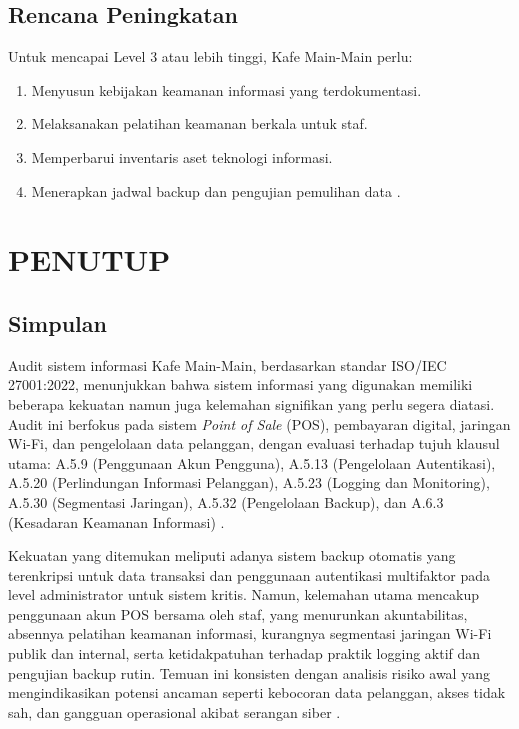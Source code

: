 \documentclass[12pt, a4paper]{report}
\begin{document}
\section{Rencana Peningkatan}
Untuk mencapai Level 3 atau lebih tinggi, Kafe Main-Main perlu:
\begin{enumerate}
    \item Menyusun kebijakan keamanan informasi yang terdokumentasi.
    \item Melaksanakan pelatihan keamanan berkala untuk staf.
    \item Memperbarui inventaris aset teknologi informasi.
    \item Menerapkan jadwal backup dan pengujian pemulihan data \citep{rokhman2018implementasi}.
\end{enumerate}

\chapter{PENUTUP}
\label{bab:penutup}

\section{Simpulan}
Audit sistem informasi Kafe Main-Main, berdasarkan standar ISO/IEC 27001:2022, menunjukkan bahwa sistem informasi yang digunakan memiliki beberapa kekuatan namun juga kelemahan signifikan yang perlu segera diatasi. Audit ini berfokus pada sistem \textit{Point of Sale} (POS), pembayaran digital, jaringan Wi-Fi, dan pengelolaan data pelanggan, dengan evaluasi terhadap tujuh klausul utama: A.5.9 (Penggunaan Akun Pengguna), A.5.13 (Pengelolaan Autentikasi), A.5.20 (Perlindungan Informasi Pelanggan), A.5.23 (Logging dan Monitoring), A.5.30 (Segmentasi Jaringan), A.5.32 (Pengelolaan Backup), dan A.6.3 (Kesadaran Keamanan Informasi) \citep{iso27001, auditkafe2025}.

 Kekuatan yang ditemukan meliputi adanya sistem backup otomatis yang terenkripsi untuk data transaksi dan penggunaan autentikasi multifaktor pada level administrator untuk sistem kritis. Namun, kelemahan utama mencakup penggunaan akun POS bersama oleh staf, yang menurunkan akuntabilitas, absennya pelatihan keamanan informasi, kurangnya segmentasi jaringan Wi-Fi publik dan internal, serta ketidakpatuhan terhadap praktik logging aktif dan pengujian backup rutin. Temuan ini konsisten dengan analisis risiko awal yang mengindikasikan potensi ancaman seperti kebocoran data pelanggan, akses tidak sah, dan gangguan operasional akibat serangan siber \citep{widodo2022keamanan, haryanto2021wifi, sari2023backup}.
\end{document}

